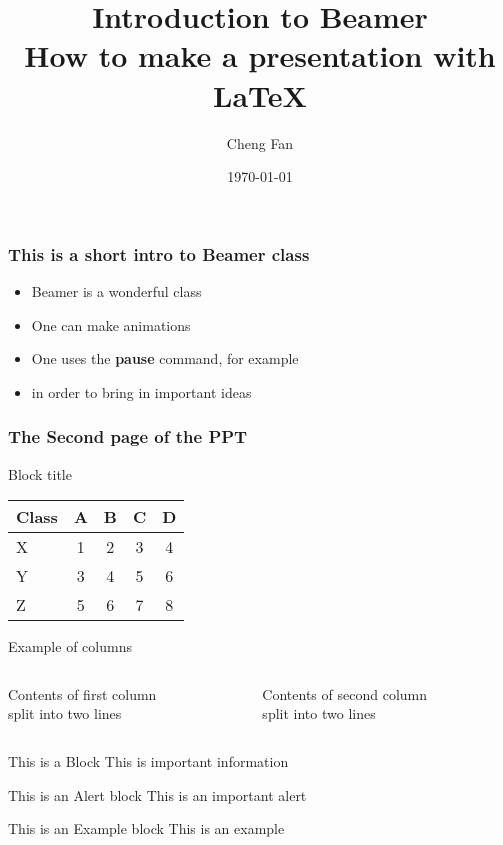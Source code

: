 \documentclass[12pt, landscape]{beamer}
\title[Making a \LaTeX Presentation Using Beamer]{Introduction to Beamer \\ How to make a presentation with \LaTeX}
\author{Cheng Fan}
\institute{The Hong Kong Polytechnic University}
\date{\today}
\begin{document}
\begin{frame}
 \titlepage
\end{frame}


\begin{frame}
 \frametitle{This is a short intro to Beamer class}
 
 \begin{itemize}
  \pause \item Beamer is a wonderful class
  \pause \item One can make animations
  \pause \item One uses the \textbf{pause} command, for example
  \pause \item in order to bring in important ideas
 \end{itemize}

\end{frame}


\begin{frame}
 \frametitle{The Second page of the PPT}
 
 \begin{block}{Block title}
  \begin{tabular}{lcccc}
  Class & A & B & C & D \\\hline
  X     & 1 & 2 & 3 & 4 \pause\\
  Y     & 3 & 4 & 5 & 6 \pause\\
  Z     & 5 & 6 & 7 & 8
\end{tabular}
 \end{block}
\end{frame}

\begin{frame}{Example of columns}
     \begin{columns}[T] 
     \begin{column}[T]{5cm} 
     Contents of first column \\ split into two lines
     \end{column}
     \begin{column}[T]{5cm} 
     Contents of second column \\ split into two lines
     \end{column}
     \end{columns}
\end{frame}

\begin{frame}
 \begin{block}{This is a Block}
      This is important information
 \end{block}
 
 \begin{alertblock}{This is an Alert block}
   This is an important alert
 \end{alertblock}
 
 \begin{exampleblock}{This is an Example block}
   This is an example 
 \end{exampleblock}
\end{frame}
\end{document}
